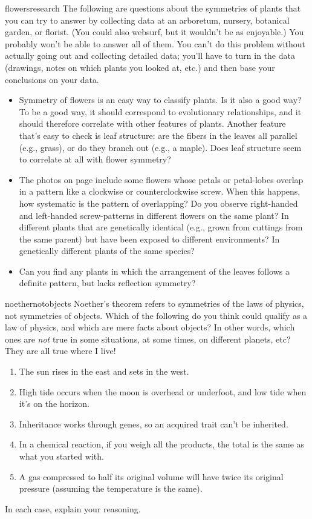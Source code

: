 \begin{hwsection}
\begin{hw}[2]{flowersresearch}
The following are questions about the symmetries of plants that you can try to
answer by collecting data at an arboretum, nursery, botanical garden, or florist.
(You could also websurf, but it wouldn't be as enjoyable.) You probably won't be
able to answer all of them. You can't do this problem without actually going out
and collecting detailed data; you'll have to turn in the data (drawings, notes
on which plants you looked at, etc.) and then base your conclusions on your data.
\begin{itemize}
 \item[] Symmetry of flowers is an easy way to classify plants. Is it also a good way?
  To be a good way, it should correspond to evolutionary relationships, and it
  should therefore correlate with other features of plants. Another feature
  that's easy to check is leaf structure: are the fibers in the leaves all
  parallel (e.g., grass), or do they branch out (e.g., a maple). Does leaf structure
  seem to correlate at all with flower symmetry?
 \item[] The photos on page \pageref{fig:flowers} include some flowers whose petals or
  petal-lobes overlap in a pattern like a clockwise or counterclockwise screw. When this
  happens, how systematic is the pattern of overlapping? Do you observe right-handed and
  left-handed screw-patterns in different flowers on the same plant? In different plants
  that are genetically identical (e.g., grown from cuttings from the same parent) but
  have been exposed to different environments? In genetically different plants of the same
  species?
 \item[] Can you find any plants in which the arrangement of the leaves follows a definite
  pattern, but lacks reflection symmetry?
\end{itemize}
\end{hw}

\begin{hw}{noethernotobjects}
Noether's theorem refers to symmetries of the laws of physics, not symmetries of
objects.
Which of the following do you think could qualify as a law of physics, and which
are mere facts about objects? In other words, which ones are \emph{not} true
in some situations, at some times, on different planets, etc? They are all true
where I live!
\begin{enumerate}
 \item The sun rises in the east and sets in the west.
 \item High tide occurs when the moon is overhead or underfoot, and low tide
   when it's on the horizon.
 \item Inheritance works through genes, so an acquired trait can't be inherited.
 \item In a chemical reaction, if you weigh all the products, the total is the same
   as what you started with.
 \item A gas compressed to half its original volume will have twice its original pressure
	(assuming the temperature is the same).
\end{enumerate}
In each case, explain your reasoning.
\end{hw}


\end{hwsection}
